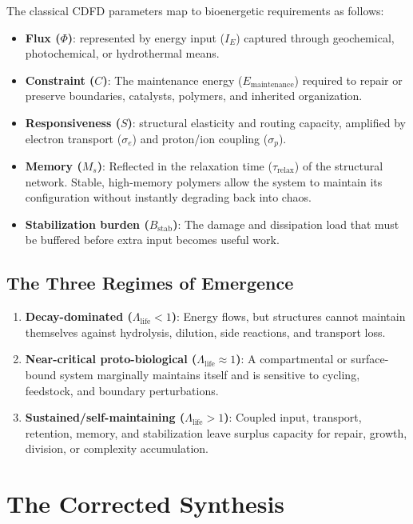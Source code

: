 \documentclass[11pt,a4paper]{article}
\begin{document}
The classical CDFD parameters map to bioenergetic requirements as follows:
\begin{itemize}
 \item \textbf{Flux ($\Phi$)}: represented by energy input ($I_E$) captured through geochemical, photochemical, or hydrothermal means.
 \item \textbf{Constraint ($C$)}: The maintenance energy ($E_{\mathrm{maintenance}}$) required to repair or preserve boundaries, catalysts, polymers, and inherited organization.
 \item \textbf{Responsiveness ($S$)}: structural elasticity and routing capacity, amplified by electron transport ($\sigma_e$) and proton/ion coupling ($\sigma_p$).
 \item \textbf{Memory ($M_s$)}: Reflected in the relaxation time ($\tau_{\mathrm{relax}}$) of the structural network. Stable, high-memory polymers allow the system to maintain its configuration without instantly degrading back into chaos.
 \item \textbf{Stabilization burden ($B_{\mathrm{stab}}$)}: The damage and dissipation load that must be buffered before extra input becomes useful work.
\end{itemize}

\subsection{The Three Regimes of Emergence}
\begin{enumerate}
 \item \textbf{Decay-dominated ($\Lambda_{\mathrm{life}} < 1$)}: Energy flows, but structures cannot maintain themselves against hydrolysis, dilution, side reactions, and transport loss.
 \item \textbf{Near-critical proto-biological ($\Lambda_{\mathrm{life}} \approx 1$)}: A compartmental or surface-bound system marginally maintains itself and is sensitive to cycling, feedstock, and boundary perturbations.
 \item \textbf{Sustained/self-maintaining ($\Lambda_{\mathrm{life}} > 1$)}: Coupled input, transport, retention, memory, and stabilization leave surplus capacity for repair, growth, division, or complexity accumulation.
\end{enumerate}

\section{The Corrected Synthesis}
\end{document}
